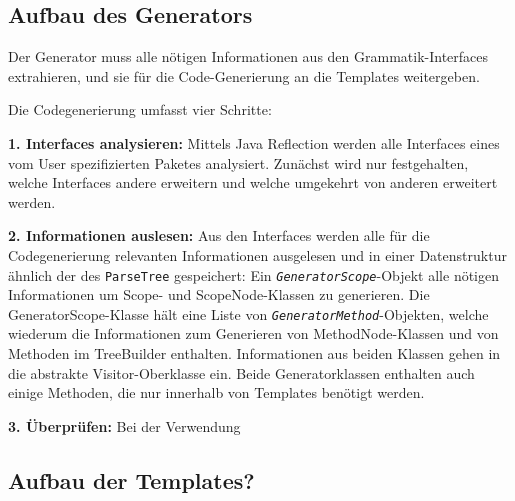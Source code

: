 \subsection{Aufbau des Generators}\label{ssct:5.2.2:generator}
Der Generator muss alle nötigen Informationen aus den Grammatik-Interfaces extrahieren, und sie für die Code-Generierung an die Templates weitergeben.

Die Codegenerierung umfasst vier Schritte:

\textbf{1. Interfaces analysieren:} Mittels Java Reflection werden alle Interfaces eines vom User spezifizierten Paketes analysiert. Zunächst wird nur festgehalten, welche Interfaces andere erweitern und welche umgekehrt von anderen erweitert werden.

\textbf{2. Informationen auslesen:} Aus den Interfaces werden alle für die Codegenerierung relevanten Informationen ausgelesen und in einer Datenstruktur ähnlich der des \texttt{ParseTree} gespeichert: Ein \emph{\texttt{GeneratorScope}}-Objekt alle nötigen Informationen um Scope- und ScopeNode-Klassen zu generieren. Die GeneratorScope-Klasse hält eine Liste von \emph{\texttt{GeneratorMethod}}-Objekten, welche wiederum die Informationen zum Generieren von MethodNode-Klassen und von Methoden im TreeBuilder enthalten. Informationen aus beiden Klassen gehen in die abstrakte Visitor-Oberklasse ein. Beide Generatorklassen enthalten auch einige Methoden, die nur innerhalb von Templates benötigt werden.

\textbf{3. Überprüfen:} Bei der Verwendung

\subsection{Aufbau der Templates?}